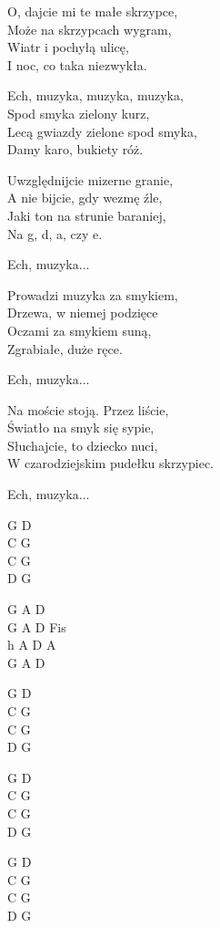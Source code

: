 \begin{text}
    O, dajcie mi te małe skrzypce,\\
    Może na skrzypcach wygram,\\
    Wiatr i pochyłą ulicę,\\
    I noc, co taka niezwykła.

    \vin Ech, muzyka, muzyka, muzyka,\\
    \vin Spod smyka zielony kurz,\\
    \vin Lecą gwiazdy zielone spod smyka,\\
    \vin Damy karo, bukiety róż.

    Uwzględnijcie mizerne granie,\\
    A nie bijcie, gdy wezmę źle,\\
    Jaki ton na strunie baraniej,\\
    Na g, d, a, czy e.

    \vin Ech, muzyka...

    Prowadzi muzyka za smykiem,\\
    Drzewa, w niemej podzięce\\
    Oczami za smykiem suną,\\
    Zgrabiałe, duże ręce.

    \vin Ech, muzyka...

    Na moście stoją. Przez liście,\\
    Światło na smyk się sypie,\\
    Słuchajcie, to dziecko nuci,\\
    W czarodziejskim pudełku skrzypiec.
    
    \vin Ech, muzyka...
\end{text}
\begin{chord}
    G D\\
    C G\\
    C G\\
    D G

    G A D\\
    G A D Fis\\
    h A D A\\
    G A D
    
    G D\\
    C G\\
    C G\\
    D G\\
    \hfill\break
    
    G D\\
    C G\\
    C G\\
    D G\\
    \hfill\break
    
    G D\\
    C G\\
    C G\\
    D G\\
    \hfill\break
\end{chord}